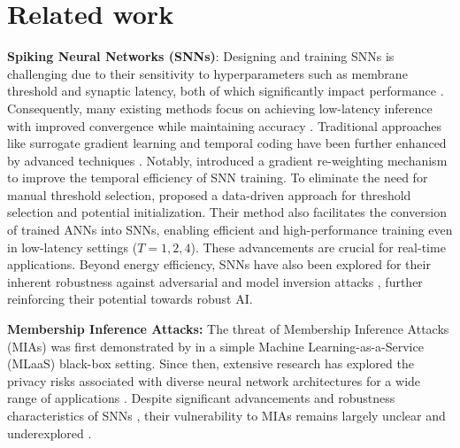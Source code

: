 \section{Related work}
\label{sec:related_work}

\textbf{Spiking Neural Networks (SNNs)}: 
Designing and training SNNs is challenging due to their sensitivity to hyperparameters such as membrane threshold and synaptic latency, both of which significantly impact performance \citep{bouvier2019spiking}. Consequently, many existing methods focus on achieving low-latency inference with improved convergence while maintaining accuracy \citep{meng2022training}. Traditional approaches like surrogate gradient learning \citep{neftci2019surrogate} and temporal coding \citep{bellec2018long} have been further enhanced by advanced techniques \citep{dampfhoffer2023backpropagation}. Notably, \citet{deng2022temporal} introduced a gradient re-weighting mechanism to improve the temporal efficiency of SNN training.
%
To eliminate the need for manual threshold selection, \citet{bojkovic2024data} proposed a data-driven approach for threshold selection and potential initialization. Their method also facilitates the conversion of trained ANNs into SNNs, enabling efficient and high-performance training even in low-latency settings ($T=1,2,4$). These advancements are crucial for real-time applications. Beyond energy efficiency, SNNs have also been explored for their inherent robustness against adversarial \citep{nomura2022robustness,el2021securing} and model inversion attacks \citep{kim2022privatesnn}, further reinforcing their potential towards robust AI.

\textbf{Membership Inference Attacks: }The threat of Membership Inference Attacks (MIAs) was first demonstrated by \citet{shokri2017membership} in a simple Machine Learning-as-a-Service (MLaaS) black-box setting. Since then, extensive research has explored the privacy risks associated with diverse neural network architectures for a wide range of applications \citep{hu2022membership,yeom2018privacy,salem2018ml}. Despite significant advancements and robustness characteristics of SNNs \citep{kim2022privatesnn}, their vulnerability to MIAs remains largely unclear and underexplored \citep{sharmin2019comprehensive}.

